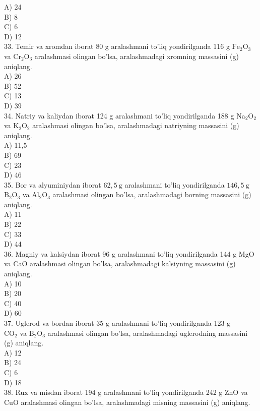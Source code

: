 A) 24\\
B) 8\\
C) 6\\
D) 12\\
33. Temir va xromdan iborat 80 g aralashmani to'liq yondirilganda 116 g $\mathrm{Fe}_{2} \mathrm{O}_{3}$ va $\mathrm{Cr}_{2} \mathrm{O}_{3}$ aralashmasi olingan bo'lsa, aralashmadagi xromning massasini (g) aniqlang.\\
A) 26\\
B) 52\\
C) 13\\
D) 39\\
34. Natriy va kaliydan iborat 124 g aralashmani to'liq yondirilganda 188 g $\mathrm{Na}_{2} \mathrm{O}_{2}$ va $\mathrm{K}_{2} \mathrm{O}_{2}$ aralashmasi olingan bo'lsa, aralashmadagi natriyning massasini (g) aniqlang.\\
A) 11,5\\
B) 69\\
C) 23\\
D) 46\\
35. Bor va alyuminiydan iborat $62,5 \mathrm{~g}$ aralashmani to'liq yondirilganda $146,5 \mathrm{~g}$ $\mathrm{B}_{2} \mathrm{O}_{3}$ va $\mathrm{Al}_{2} \mathrm{O}_{3}$ aralashmasi olingan bo'lsa, aralashmadagi borning massasini (g) aniqlang.\\
A) 11\\
B) 22\\
C) 33\\
D) 44\\
36. Magniy va kalsiydan iborat 96 g aralashmani to'liq yondirilganda 144 g MgO va CaO aralashmasi olingan bo'lsa, aralashmadagi kalsiyning massasini (g) aniqlang.\\
A) 10\\
B) 20\\
C) 40\\
D) 60\\
37. Uglerod va bordan iborat 35 g aralashmani to'liq yondirilganda 123 g\\$\mathrm{CO}_{2}$ va $\mathrm{B}_{2} \mathrm{O}_{3}$ aralashmasi olingan bo'lsa, aralashmadagi uglerodning massasini (g) aniqlang.\\
A) 12\\
B) 24\\
C) 6\\
D) 18\\
38. Rux va misdan iborat 194 g aralashmani to'liq yondirilganda 242 g ZnO va CuO aralashmasi olingan bo'lsa, aralashmadagi misning massasini (g) aniqlang.\\
